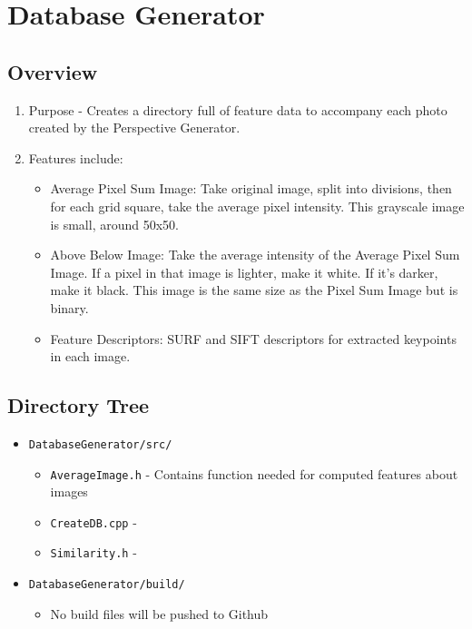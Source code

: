 \documentclass[a4paper,11pt]{article}
\begin{document}
\section{Database Generator}
  \subsection{Overview}
    \begin{enumerate}
    \item Purpose - Creates a directory full of feature data to accompany each photo created by the Perspective Generator. 
    \item Features include:
      \begin{itemize}
        \item Average Pixel Sum Image: Take original image, split into divisions, then for each grid square, take the average pixel intensity. This grayscale image is small, around 50x50.
        \item Above Below Image: Take the average intensity of the Average Pixel Sum Image. If a pixel in that image is lighter, make it white. If it's darker, make it black. This image is the same size as the Pixel Sum Image but is binary.
        \item Feature Descriptors: SURF and SIFT descriptors for extracted keypoints in each image.
      \end{itemize}
    \end{enumerate}
  \subsection{Directory Tree}
    \begin{itemize}
     \item \texttt{DatabaseGenerator/src/}
       \begin{itemize}
        \item \texttt{AverageImage.h} - Contains function needed for computed features about images
        \item \texttt{CreateDB.cpp} -
        \item \texttt{Similarity.h} -
       \end{itemize}
     \item \texttt{DatabaseGenerator/build/}
       \begin{itemize}
        \item No build files will be pushed to Github
       \end{itemize}
    \end{itemize}
\end{document}
